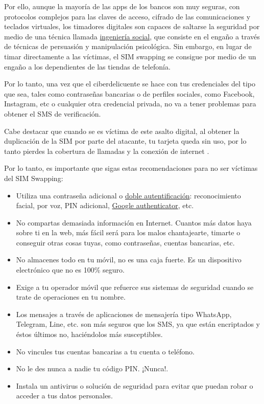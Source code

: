 \documentclass[
  spanish,
  a4paper,
  openany]{book}
\begin{document}
Por ello, aunque la mayoría de las apps de los bancos son muy seguras, con protocolos complejos para las claves de acceso, cifrado de las comunicaciones y teclados virtuales, los timadores digitales son capaces de saltarse la seguridad por medio de una técnica llamada \href{https://es.wikipedia.org/wiki/Ingeniería_social_(seguridad_informática)}{ingeniería social}, que consiste en el engaño a través de técnicas de persuasión y manipulación psicológica. Sin embargo, en lugar de timar directamente a las víctimas, el SIM swapping se consigue por medio de un engaño a los dependientes de las tiendas de telefonía.

Por lo tanto, una vez que el ciberdelicuente se hace con tus credenciales del tipo que sea, tales como contraseñas bancarias o de perfiles sociales, como Facebook, Instagram, etc o cualquier otra credencial privada, no va a tener problemas para obtener el SMS de verificación.

Cabe destacar que cuando se es víctima de este asalto digital, al obtener la duplicación de la SIM por parte del atacante, tu tarjeta queda sin uso, por lo tanto pierdes la cobertura de llamadas y la conexión de internet \citep{PANDA-sim}.

Por lo tanto, es importante que sigas estas recomendaciones para no ser víctimas del SIM Swapping:

\begin{itemize}
\item
  Utiliza una contraseña adicional o \href{https://www.osi.es/es/actualidad/blog/2019/02/27/el-factor-de-autenticacion-doble-y-multiple}{doble autentificación}: reconocimiento facial, por voz, PIN adicional, \href{https://play.google.com/store/apps/details?id=com.google.android.apps.authenticator2\&hl=es\&gl=US}{Google authenticator}, etc.
\item
  No compartas demasiada información en Internet. Cuantos más datos haya sobre ti en la web, más fácil será para los malos chantajearte, timarte o conseguir otras cosas tuyas, como contraseñas, cuentas bancarias, etc.
\item
  No almacenes todo en tu móvil, no es una caja fuerte. Es un dispositivo electrónico que no es 100\% seguro.
\item
  Exige a tu operador móvil que refuerce sus sistemas de seguridad cuando se trate de operaciones en tu nombre.
\item
  Los mensajes a través de aplicaciones de mensajería tipo WhatsApp, Telegram, Line, etc. son más seguros que los SMS, ya que están encriptados y éstos últimos no, haciéndolos más susceptibles.
\item
  No vincules tus cuentas bancarias a tu cuenta o teléfono.
\item
  No le des nunca a nadie tu código PIN. ¡Nunca!.
\item
  Instala un antivirus o solución de seguridad para evitar que puedan robar o acceder a tus datos personales.
\end{itemize}
\end{document}
